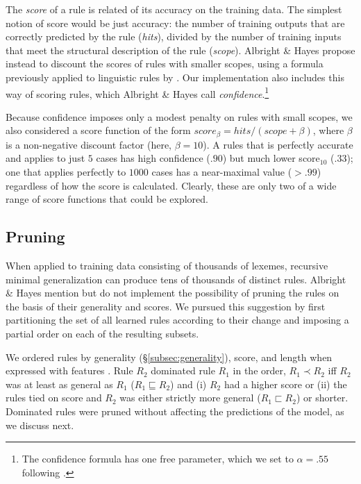 \documentclass[11pt]{article}
\begin{document}
The \emph{score} of a rule is related of its accuracy on the training data. The simplest notion of score would be just accuracy: the number of training outputs that are correctly predicted by the rule (\emph{hits}), divided by the number of training inputs that meet the structural description of the rule (\emph{scope}). Albright \& Hayes propose instead to discount the scores of rules with smaller scopes, using a formula previously applied to linguistic rules by \citet{mikheev-1997-automatic}. Our implementation also includes this way of scoring rules, which Albright \& Hayes call \textit{confidence}.\footnote{The confidence formula has one free parameter, which we set to $\alpha = .55$ following \citet[][p. 127]{albright2003}.}

Because confidence imposes only a modest penalty on rules with small scopes, we also considered a score function of the form $score_{\beta} = hits / (scope + \beta)$, where $\beta$ is a non-negative discount factor (here, $\beta = 10$). A rules that is perfectly accurate and applies to just $5$ cases has high confidence ($.90$) but much lower score$_{10}$ ($.33$); one that applies perfectly to $1000$ cases has a near-maximal value ($> .99$) regardless of how the score is calculated. Clearly, these are only two of a wide range of score functions that could be explored.

\subsection{Pruning}
\label{subsec:pruning}

When applied to training data consisting of thousands of lexemes, recursive minimal generalization can produce tens of thousands of distinct rules. Albright \& Hayes mention but do not implement the possibility of pruning the rules on the basis of their generality and scores. We pursued this suggestion by first partitioning the set of all learned rules according to their change and imposing a partial order on each of the resulting subsets.

We ordered rules by generality (\S\ref{subsec:generality}), score, and length when expressed with features \citep{chomsky1968a}. Rule $R_2$ dominated rule $R_1$ in the order, $R_1 \prec R_2$ iff $R_2$ was at least as general as $R_1$ ($R_1 \sqsubseteq R_2$) and (i) $R_2$ had a higher score or (ii) the rules tied on score and $R_2$ was either strictly more general ($R_1 \sqsubset R_2$) or shorter. Dominated rules were pruned without affecting the predictions of the model, as we discuss next.
\end{document}
